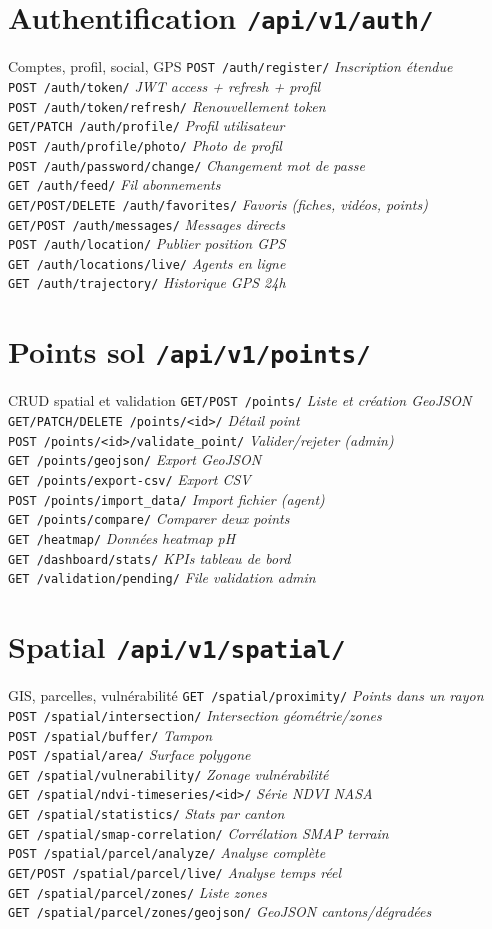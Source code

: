 \documentclass[11pt,a4paper]{report}
\newcommand{\endpoint}[2]{\texttt{#1} \hfill \textit{#2}\\}
\begin{document}
\section{Authentification \texttt{/api/v1/auth/}}
\begin{apibox}{Comptes, profil, social, GPS}
\endpoint{POST /auth/register/}{Inscription étendue}
\endpoint{POST /auth/token/}{JWT access + refresh + profil}
\endpoint{POST /auth/token/refresh/}{Renouvellement token}
\endpoint{GET/PATCH /auth/profile/}{Profil utilisateur}
\endpoint{POST /auth/profile/photo/}{Photo de profil}
\endpoint{POST /auth/password/change/}{Changement mot de passe}
\endpoint{GET /auth/feed/}{Fil abonnements}
\endpoint{GET/POST/DELETE /auth/favorites/}{Favoris (fiches, vidéos, points)}
\endpoint{GET/POST /auth/messages/}{Messages directs}
\endpoint{POST /auth/location/}{Publier position GPS}
\endpoint{GET /auth/locations/live/}{Agents en ligne}
\endpoint{GET /auth/trajectory/}{Historique GPS 24h}
\end{apibox}

\section{Points sol \texttt{/api/v1/points/}}
\begin{apibox}{CRUD spatial et validation}
\endpoint{GET/POST /points/}{Liste et création GeoJSON}
\endpoint{GET/PATCH/DELETE /points/<id>/}{Détail point}
\endpoint{POST /points/<id>/validate\_point/}{Valider/rejeter (admin)}
\endpoint{GET /points/geojson/}{Export GeoJSON}
\endpoint{GET /points/export-csv/}{Export CSV}
\endpoint{POST /points/import\_data/}{Import fichier (agent)}
\endpoint{GET /points/compare/}{Comparer deux points}
\endpoint{GET /heatmap/}{Données heatmap pH}
\endpoint{GET /dashboard/stats/}{KPIs tableau de bord}
\endpoint{GET /validation/pending/}{File validation admin}
\end{apibox}

\section{Spatial \texttt{/api/v1/spatial/}}
\begin{apibox}{GIS, parcelles, vulnérabilité}
\endpoint{GET /spatial/proximity/}{Points dans un rayon}
\endpoint{POST /spatial/intersection/}{Intersection géométrie/zones}
\endpoint{POST /spatial/buffer/}{Tampon}
\endpoint{POST /spatial/area/}{Surface polygone}
\endpoint{GET /spatial/vulnerability/}{Zonage vulnérabilité}
\endpoint{GET /spatial/ndvi-timeseries/<id>/}{Série NDVI NASA}
\endpoint{GET /spatial/statistics/}{Stats par canton}
\endpoint{GET /spatial/smap-correlation/}{Corrélation SMAP terrain}
\endpoint{POST /spatial/parcel/analyze/}{Analyse complète}
\endpoint{GET/POST /spatial/parcel/live/}{Analyse temps réel}
\endpoint{GET /spatial/parcel/zones/}{Liste zones}
\endpoint{GET /spatial/parcel/zones/geojson/}{GeoJSON cantons/dégradées}
\end{apibox}
\end{document}
